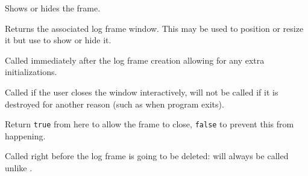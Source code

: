
\label{wxlogwindowshow}


Shows or hides the frame.

\label{wxlogwindowgetframe}


Returns the associated log frame window. This may be used to position or resize
it but use  to show or hide it.

\label{wxlogwindowonframecreate}


Called immediately after the log frame creation allowing for
any extra initializations.

\label{wxlogwindowonframeclose}


Called if the user closes the window interactively, will not be
called if it is destroyed for another reason (such as when program
exits).

Return {\tt true} from here to allow the frame to close, {\tt false} to
prevent this from happening.



\label{wxlogwindowonframedelete}


Called right before the log frame is going to be deleted: will
always be called unlike .

